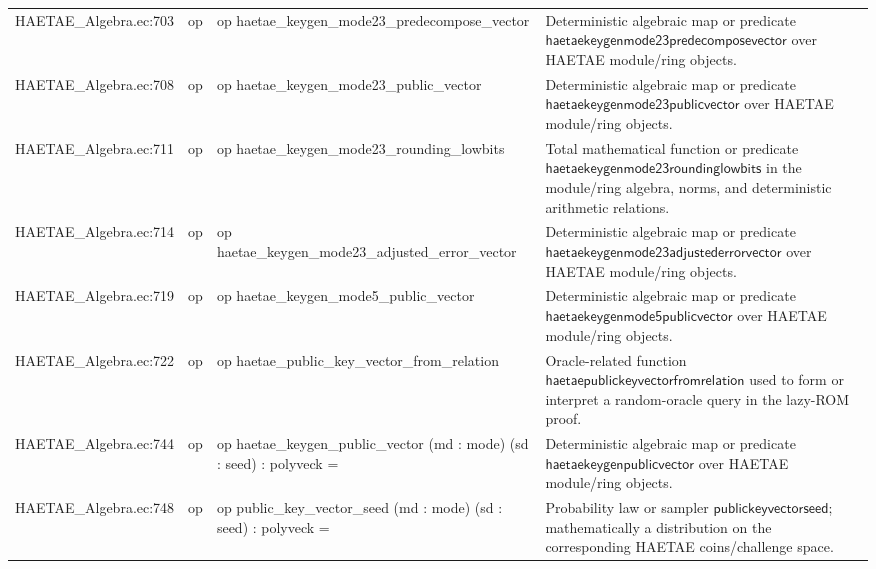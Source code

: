 \documentclass[10pt]{article}
\begin{document}
\begin{longtable}{L{0.11\textwidth}L{0.055\textwidth}L{0.385\textwidth}L{0.41\textwidth}}
HAETAE\_\allowbreak{}Algebra.\allowbreak{}ec:\allowbreak{}703 & op & {\ttfamily\scriptsize op haetae\_\allowbreak{}keygen\_\allowbreak{}mode23\_\allowbreak{}predecompose\_\allowbreak{}vector} & Deterministic algebraic map or predicate $\mathsf{haetaekeygenmode23predecomposevector}$ over HAETAE module/ring objects. \\
HAETAE\_\allowbreak{}Algebra.\allowbreak{}ec:\allowbreak{}708 & op & {\ttfamily\scriptsize op haetae\_\allowbreak{}keygen\_\allowbreak{}mode23\_\allowbreak{}public\_\allowbreak{}vector} & Deterministic algebraic map or predicate $\mathsf{haetaekeygenmode23publicvector}$ over HAETAE module/ring objects. \\
HAETAE\_\allowbreak{}Algebra.\allowbreak{}ec:\allowbreak{}711 & op & {\ttfamily\scriptsize op haetae\_\allowbreak{}keygen\_\allowbreak{}mode23\_\allowbreak{}rounding\_\allowbreak{}lowbits} & Total mathematical function or predicate $\mathsf{haetaekeygenmode23roundinglowbits}$ in the module/ring algebra, norms, and deterministic arithmetic relations. \\
HAETAE\_\allowbreak{}Algebra.\allowbreak{}ec:\allowbreak{}714 & op & {\ttfamily\scriptsize op haetae\_\allowbreak{}keygen\_\allowbreak{}mode23\_\allowbreak{}adjusted\_\allowbreak{}error\_\allowbreak{}vector} & Deterministic algebraic map or predicate $\mathsf{haetaekeygenmode23adjustederrorvector}$ over HAETAE module/ring objects. \\
HAETAE\_\allowbreak{}Algebra.\allowbreak{}ec:\allowbreak{}719 & op & {\ttfamily\scriptsize op haetae\_\allowbreak{}keygen\_\allowbreak{}mode5\_\allowbreak{}public\_\allowbreak{}vector} & Deterministic algebraic map or predicate $\mathsf{haetaekeygenmode5publicvector}$ over HAETAE module/ring objects. \\
HAETAE\_\allowbreak{}Algebra.\allowbreak{}ec:\allowbreak{}722 & op & {\ttfamily\scriptsize op haetae\_\allowbreak{}public\_\allowbreak{}key\_\allowbreak{}vector\_\allowbreak{}from\_\allowbreak{}relation} & Oracle-related function $\mathsf{haetaepublickeyvectorfromrelation}$ used to form or interpret a random-oracle query in the lazy-ROM proof. \\
HAETAE\_\allowbreak{}Algebra.\allowbreak{}ec:\allowbreak{}744 & op & {\ttfamily\scriptsize op haetae\_\allowbreak{}keygen\_\allowbreak{}public\_\allowbreak{}vector (md : mode) (sd : seed) : polyveck =} & Deterministic algebraic map or predicate $\mathsf{haetaekeygenpublicvector}$ over HAETAE module/ring objects. \\
HAETAE\_\allowbreak{}Algebra.\allowbreak{}ec:\allowbreak{}748 & op & {\ttfamily\scriptsize op public\_\allowbreak{}key\_\allowbreak{}vector\_\allowbreak{}seed (md : mode) (sd : seed) : polyveck =} & Probability law or sampler $\mathsf{publickeyvectorseed}$; mathematically a distribution on the corresponding HAETAE coins/challenge space. \\

\end{longtable}
\end{document}
